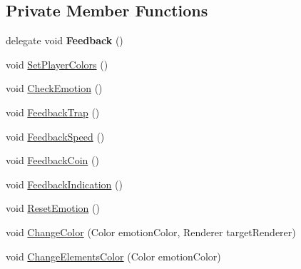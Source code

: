\subsection*{Private Member Functions}
\begin{DoxyCompactItemize}
\item 
\mbox{\label{class_platforms_generation_emotion_controller_afa978405d623921bd5407496d71afea7}} 
delegate void {\bfseries Feedback} ()
\item 
void \mbox{\hyperlink{class_platforms_generation_emotion_controller_a31a0ab66056948f481073c04eacde9c1}{Set\+Player\+Colors}} ()
\item 
void \mbox{\hyperlink{class_platforms_generation_emotion_controller_a557677a652a50966d801073af00b60db}{Check\+Emotion}} ()
\item 
void \mbox{\hyperlink{class_platforms_generation_emotion_controller_a57222479c51ad4da8154e013832f8df1}{Feedback\+Trap}} ()
\item 
void \mbox{\hyperlink{class_platforms_generation_emotion_controller_a78eccdfc0a9fd67224b7aef2f13309ee}{Feedback\+Speed}} ()
\item 
void \mbox{\hyperlink{class_platforms_generation_emotion_controller_a6c2907515619dcfa5ad5ff9a1f7f95cd}{Feedback\+Coin}} ()
\item 
void \mbox{\hyperlink{class_platforms_generation_emotion_controller_af4dad82b6527fb1fd97eb5c1aaa32769}{Feedback\+Indication}} ()
\item 
void \mbox{\hyperlink{class_platforms_generation_emotion_controller_ae9d8a0d70cba3fc5f4ec97c565df3eab}{Reset\+Emotion}} ()
\item 
void \mbox{\hyperlink{class_platforms_generation_emotion_controller_a557b90796bdcfd06701f93338b9180d9}{Change\+Color}} (Color emotion\+Color, Renderer target\+Renderer)
\item 
void \mbox{\hyperlink{class_platforms_generation_emotion_controller_ab736444d29bf54d457d1e90beb4d1379}{Change\+Elements\+Color}} (Color emotion\+Color)
\end{DoxyCompactItemize}
